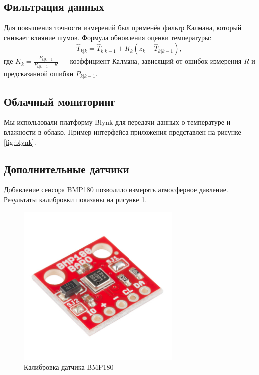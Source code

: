 \documentclass[a4paper,12pt]{article}
\begin{document}
\subsection{Фильтрация данных}
Для повышения точности измерений был применён фильтр Калмана, который снижает влияние шумов. Формула обновления оценки температуры:
\begin{equation}
    \hat{T}_{k|k} = \hat{T}_{k|k-1} + K_k (z_k - \hat{T}_{k|k-1}),
\end{equation}
где \( K_k = \frac{P_{k|k-1}}{P_{k|k-1} + R} \) — коэффициент Калмана, зависящий от ошибок измерения \( R \) и предсказанной ошибки \( P_{k|k-1} \).

\subsection{Облачный мониторинг}
Мы использовали платформу Blynk для передачи данных о температуре и влажности в облако. Пример интерфейса приложения представлен на рисунке \ref{fig:blynk}.

\subsection{Дополнительные датчики}
Добавление сенсора BMP180 позволило измерять атмосферное давление. Результаты калибровки показаны на рисунке \ref{fig:sensor}.

\begin{figure}[H]
    \centering
    \includegraphics[width=0.7\textwidth]{sensor.jpg}
    \caption{Калибровка датчика BMP180}
    \label{fig:sensor}
\end{figure}
\end{document}
